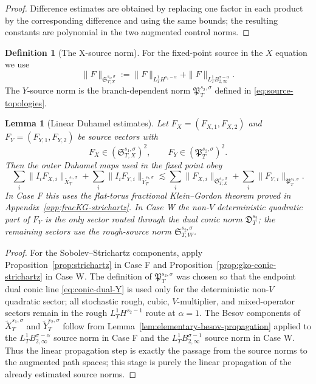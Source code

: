 \documentclass[10pt]{amsart}
\numberwithin{equation}{section}
\theoremstyle{plain}
\newtheorem{lemma}[theorem]{Lemma}
\theoremstyle{definition}
\newtheorem{definition}[theorem]{Definition}
\theoremstyle{remark}
\begin{document}
\begin{proof}
Difference estimates are obtained by replacing one factor in each product by the corresponding difference and using the same bounds; the resulting constants are polynomial in the two augmented control norms.
\end{proof}

\begin{definition}[The X-source norm]\label{def:X-source-norm}
For the fixed-point source in the $X$ equation we use
\begin{equation}\label{eq:X-source-topology}
        \|F\|_{\mathfrak S_{T,X}^{s_1,\sigma}}
        :=\|F\|_{L_T^1H^{s_1-\alpha}}
          +\|F\|_{L_T^1B_{2,\infty}^{\sigma-\alpha}}.
\end{equation}
The $Y$-source norm is the branch-dependent norm $\mathfrak P_T^{s_2,\sigma}$ defined in \eqref{eq:source-topologies}.
\end{definition}

\begin{lemma}[Linear Duhamel estimates]\label{lem:linear-duhamel-estimates}
Let \(F_X=(F_{X,1},F_{X,2})\) and \(F_Y=(F_{Y,1},F_{Y,2})\) be source vectors with
\[
        F_X\in (\mathfrak S_{T,X}^{s_1,\sigma})^2,
        \qquad
        F_Y\in (\mathfrak P_T^{s_2,\sigma})^2.
\]
Then the outer Duhamel maps used in the fixed point obey
\begin{equation}\label{eq:linear-duhamel-estimates}
\sum_i\|I_iF_{X,i}\|_{\widetilde X_T^{s_1,\sigma}}
+\sum_i\|I_iF_{Y,i}\|_{\widetilde Y_T^{s_2,\sigma}}
\lesssim
\sum_i\|F_{X,i}\|_{\mathfrak S_{T,X}^{s_1,\sigma}}
+\sum_i\|F_{Y,i}\|_{\mathfrak P_T^{s_2,\sigma}}.
\end{equation}
In Case F this uses the flat-torus fractional Klein--Gordon theorem proved in Appendix~\ref{app:fracKG-strichartz}.  In Case W the non-\(V\) deterministic quadratic part of \(F_Y\) is the only sector routed through the dual conic norm \(\mathfrak D_T^{s_2}\); the remaining sectors use the rough-source norm \(\mathfrak S_{T,W}^{s_2,\sigma}\).
\end{lemma}

\begin{proof}
For the Sobolev--Strichartz components, apply Proposition~\ref{prop:strichartz} in Case F and Proposition~\ref{prop:gko-conic-strichartz} in Case W.  The definition of \(\mathfrak P_T^{s_2,\sigma}\) was chosen so that the endpoint dual conic line \eqref{eq:conic-dual-Y} is used only for the deterministic non-\(V\) quadratic sector; all stochastic rough, cubic, \(V\)-multiplier, and mixed-operator sectors remain in the rough \(L_T^1H^{s_2-1}\) route at \(\alpha=1\).  The Besov components of \(\widetilde X_T^{s_1,\sigma}\) and \(\widetilde Y_T^{s_2,\sigma}\) follow from Lemma~\ref{lem:elementary-besov-propagation} applied to the \(L_T^1B_{2,\infty}^{\sigma-\alpha}\) source norm in Case F and the \(L_T^1B_{2,\infty}^{\sigma-1}\) source norm in Case W.  Thus the linear propagation step is exactly the passage from the source norms to the augmented path spaces; this stage is purely the linear propagation of the already estimated source norms.
\end{proof}
\end{document}
